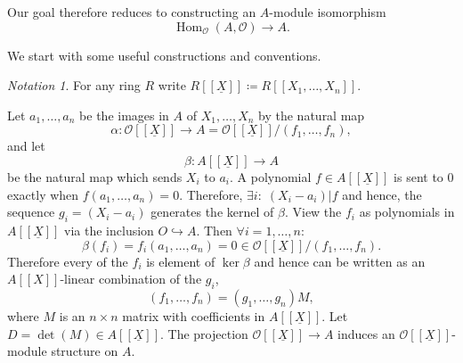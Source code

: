 \documentclass{article}
\theoremstyle{plain}%
\theoremstyle{definition}
\theoremstyle{remark}
\newtheorem*{notation}{Notation}
\renewcommand{\hom}{\operatorname{Hom}}
\begin{document}
Our goal therefore reduces to constructing an \(A\)-module isomorphism
\[
    \hom_\mathcal{O}(A, \mathcal{O}) \to A.
\]

We start with some useful constructions and conventions.
\begin{notation}
    For any ring \(R\) write \(R[[\underline{X}]] \coloneqq R[[X_1, \dots, X_n]]\).
\end{notation}

Let \(a_1, \dots, a_n\) be the images in \(A\) of \(X_1, \dots, X_n\) by the natural map
\[
    \alpha \colon \mathcal{O}[[\underline{X}]] \to A = \mathcal{O}[[\underline{X}]]/(f_1, \dots, f_n),
\]
and let
\[
    \beta \colon A[[\underline{X}]] \to A  
\]
be the natural map which sends \(X_i\) to \(a_i\). 
A polynomial \(f \in A[[\underline{X}]]\) is sent to \(0\) exactly when \(f(a_1, \dots, a_n) = 0\).
Therefore, \(\exists i\colon\; (X_i - a_i)|f\) and hence, 
the sequence \(g_i =  (X_i - a_i)\) generates the kernel of \(\beta\).
View the \(f_i\) as polynomials in \(A[[\underline{X}]]\) via the inclusion \(O \hookrightarrow A\). 
Then \(\forall i = 1, \dots, n\colon\)
\[
    \beta(f_i) = f_i(a_1, \dots, a_n) = 0 \in \mathcal{O}[[\underline{X}]]/(f_1, \dots, f_n).
\]
Therefore every of the \(f_i\) is element of \(\ker \beta\) and hence can be written as 
an \(A[[X]]\)-linear combination of the \(g_i\),
\[
    (f_1, \dots, f_n) = (g_1, \dots, g_n)M,  
\]
where \(M\) is an \(n \times n\) matrix with coefficients in \(A[[\underline{X}]]\). 
Let \(D = \det(M) \in A[[\underline{X}]]\).
The projection \(\mathcal{O}[[\underline{X}]] \to A\) induces an \(\mathcal{O}[[\underline{X}]]\)-module 
structure on \(A\).
\end{document}
